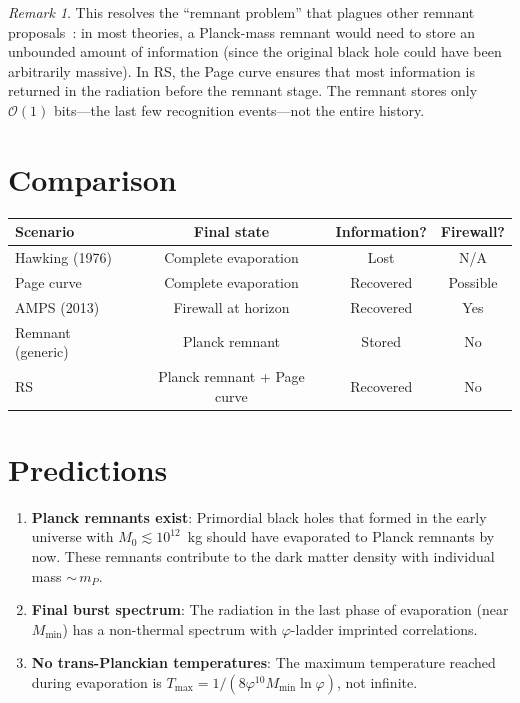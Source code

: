\documentclass[12pt,a4paper]{article}
\theoremstyle{definition}
\theoremstyle{remark}
\newtheorem{remark}[theorem]{Remark}
\begin{document}
\begin{remark}
This resolves the ``remnant problem'' that plagues other remnant
proposals~\cite{Chen2015}: in most theories, a Planck-mass remnant
would need to store an unbounded amount of information (since the
original black hole could have been arbitrarily massive).  In RS,
the Page curve ensures that most information is returned in the
radiation before the remnant stage.  The remnant stores only
$\mathcal{O}(1)$ bits---the last few recognition events---not the
entire history.
\end{remark}

\section{Comparison}
\label{sec:comparison}

\begin{center}
\renewcommand{\arraystretch}{1.3}
\begin{tabular}{@{}lccc@{}}
\toprule
\textbf{Scenario} & \textbf{Final state} &
\textbf{Information?} & \textbf{Firewall?} \\
\midrule
Hawking (1976) & Complete evaporation & Lost & N/A \\
Page curve & Complete evaporation & Recovered & Possible \\
AMPS (2013) & Firewall at horizon & Recovered & Yes \\
Remnant (generic) & Planck remnant & Stored & No \\
RS & Planck remnant + Page curve & Recovered & No \\
\bottomrule
\end{tabular}
\end{center}

\section{Predictions}
\label{sec:predictions}

\begin{enumerate}
  \item \textbf{Planck remnants exist}: Primordial black holes that
  formed in the early universe with $M_0 \lesssim 10^{12}$~kg should
  have evaporated to Planck remnants by now.  These remnants
  contribute to the dark matter density with individual mass
  ${\sim}\,m_P$.

  \item \textbf{Final burst spectrum}: The radiation in the last
  phase of evaporation (near $M_{\mathrm{min}}$) has a non-thermal
  spectrum with $\varphi$-ladder imprinted correlations.

  \item \textbf{No trans-Planckian temperatures}: The maximum
  temperature reached during evaporation is
  $T_{\max} = 1/(8\varphi^{10} M_{\mathrm{min}} \ln\varphi)$, not
  infinite.
\end{enumerate}
\end{document}
